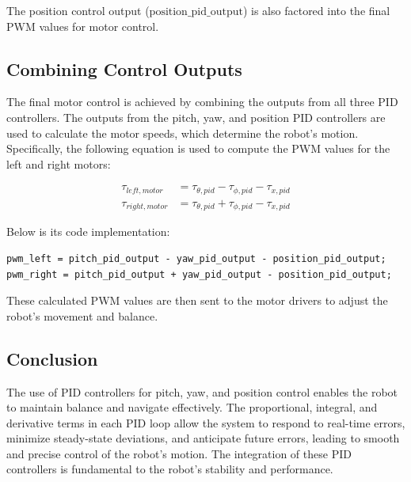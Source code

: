 The position control output ($\text{position\_pid\_output}$) is also factored into the final PWM values for motor control.

\subsection{Combining Control Outputs}

The final motor control is achieved by combining the outputs from all three PID controllers. The outputs from the pitch, yaw, and position PID controllers are used to calculate the motor speeds, which determine the robot's motion. Specifically, the following equation is used to compute the PWM values for the left and right motors:

\begin{align}
	\tau_{left,motor} &= \tau_{\theta,pid} - \tau_{\phi,pid} - \tau_{x,pid} \\
	\tau_{right,motor} &= \tau_{\theta,pid} + \tau_{\phi,pid} - \tau_{x,pid}
\end{align}

Below is its code implementation:
\begin{lstlisting}[style=cppstyle]
pwm_left = pitch_pid_output - yaw_pid_output - position_pid_output;
pwm_right = pitch_pid_output + yaw_pid_output - position_pid_output;
\end{lstlisting}

These calculated PWM values are then sent to the motor drivers to adjust the robot's movement and balance.

\subsection{Conclusion}

The use of PID controllers for pitch, yaw, and position control enables the robot to maintain balance and navigate effectively. The proportional, integral, and derivative terms in each PID loop allow the system to respond to real-time errors, minimize steady-state deviations, and anticipate future errors, leading to smooth and precise control of the robot's motion. The integration of these PID controllers is fundamental to the robot's stability and performance.

